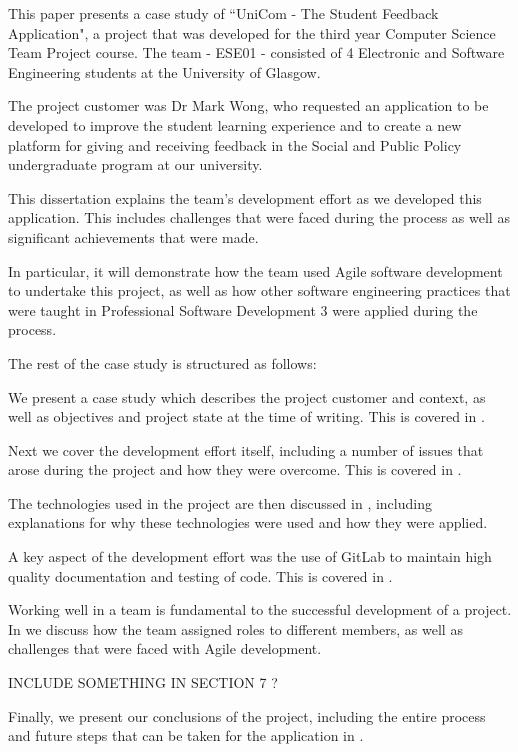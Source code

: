 \documentclass[../dissertation.tex]{subfiles}
\begin{document}
This paper presents a case study of ``UniCom - The Student Feedback Application", a project that was developed for the third year Computer Science Team Project course. The team - ESE01 - consisted of 4 Electronic and Software Engineering students at the University of Glasgow.

The project customer was Dr Mark Wong, who requested an application to be developed to improve the student learning experience and to create a new platform for giving and receiving feedback in the Social and Public Policy undergraduate program at our university.

This dissertation explains the team's development effort as we developed this application. This includes challenges that were faced during the process as well as significant achievements that were made.

In particular, it will demonstrate how the team used Agile software development to undertake this project, as well as how other software engineering practices that were taught in Professional Software Development 3 were applied during the process.


The rest of the case study is structured as follows:

We present a case study which describes the project customer and context, as well as objectives and project state at the time of writing. This is covered in .

Next we cover the development effort itself, including a number of issues that arose during the project and how they were overcome. This is covered in .

The technologies used in the project are then discussed in , including explanations for why these technologies were used and how they were applied.

A key aspect of the development effort was the use of GitLab to maintain high quality documentation and testing of code. This is covered in .

Working well in a team is fundamental to the successful development of a project. In  we discuss how the team assigned roles to different members, as well as challenges that were faced with Agile development.

INCLUDE SOMETHING IN SECTION 7 ?

Finally, we present our conclusions of the project, including the entire process and future steps that can be taken for the application in .
\end{document}
